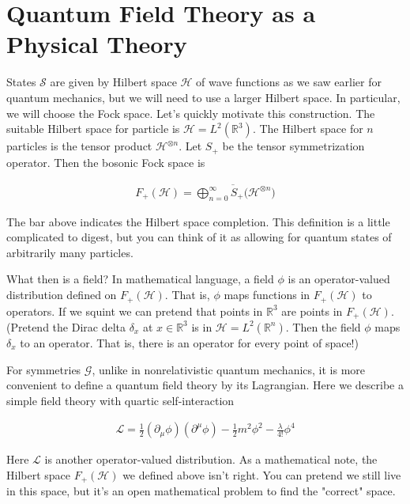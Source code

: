 \documentclass[book.tex]{subfiles}
\begin{document}

\section{Quantum Field Theory as a Physical Theory}


States $\mathcal{S}$ are given by Hilbert space $\mathcal{H}$ of wave functions as we saw earlier for quantum mechanics, but we will need to use a larger Hilbert space. In particular, we will choose the Fock space. Let's quickly motivate this construction.  The suitable Hilbert space for particle is $\mathcal{H} = L^2(\mathbb{R}^3)$. The Hilbert space for $n$ particles is the tensor product $\mathcal{H}^{\otimes n}$. Let $S_+$ be the tensor symmetrization operator. Then the bosonic Fock space is
    
\begin{align} F_+(\mathcal{H}) = \overline{\bigoplus_{n=0}^\infty S_+(\mathcal{H}^{\otimes n}}) \end{align}
    
The bar above indicates the Hilbert space completion. This definition is a little complicated to digest, but you can think of it as allowing for quantum states of arbitrarily many particles.
    
What then is a field? In mathematical language, a field $\phi$ is an operator-valued distribution defined on $F_+(\mathcal{H})$. That is, $\phi$ maps functions in $F_+(\mathcal{H})$ to operators. If we squint we can pretend that points in $\mathbb{R}^3$ are points in $F_+(\mathcal{H})$. (Pretend the Dirac delta $\delta_x$ at $x \in \mathbb{R}^3$ is in $\mathcal{H} = L^2(\mathbb{R}^n)$. Then the field $\phi$ maps $\delta_x$ to an operator. That is, there is an operator for every point of space!)

For symmetries $\mathcal{G}$, unlike in nonrelativistic quantum mechanics, it is more convenient to define a quantum field theory by its Lagrangian. Here we describe a simple field theory with quartic self-interaction
    
\begin{align} \mathcal{L} = \frac{1}{2} (\partial_{\mu} \phi) (\partial^{\mu} \phi) - \frac{1}{2} m^2 \phi^2 - \frac{\lambda}{4!} \phi^4 \end{align}
    
Here $\mathcal{L}$ is another operator-valued distribution. As a mathematical note, the Hilbert space $F_+(\mathcal{H})$ we defined above isn't right. You can pretend we still live in this space, but it's an open mathematical problem to find the "correct" space.
\end{document}
